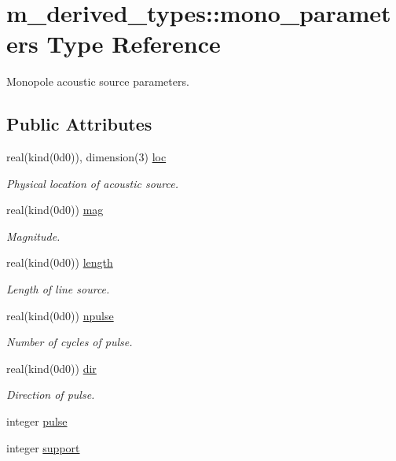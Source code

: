 \hypertarget{structm__derived__types_1_1mono__parameters}{}\section{m\+\_\+derived\+\_\+types\+:\+:mono\+\_\+parameters Type Reference}
\label{structm__derived__types_1_1mono__parameters}


Monopole acoustic source parameters.  


\subsection*{Public Attributes}
\begin{DoxyCompactItemize}
\item 
real(kind(0d0)), dimension(3) \hyperlink{structm__derived__types_1_1mono__parameters_a67f7e32fdd892aa007b28a1ea7ddd6dc}{loc}
\begin{DoxyCompactList}\small\item\em Physical location of acoustic source. \end{DoxyCompactList}\item 
real(kind(0d0)) \hyperlink{structm__derived__types_1_1mono__parameters_a62d3a0fb977b0ea3a1da97d6fbe5c99b}{mag}
\begin{DoxyCompactList}\small\item\em Magnitude. \end{DoxyCompactList}\item 
real(kind(0d0)) \hyperlink{structm__derived__types_1_1mono__parameters_a6fb20608c56428c842df5373ae35bb94}{length}
\begin{DoxyCompactList}\small\item\em Length of line source. \end{DoxyCompactList}\item 
real(kind(0d0)) \hyperlink{structm__derived__types_1_1mono__parameters_a3171e1895de6957a754d123f1d170833}{npulse}
\begin{DoxyCompactList}\small\item\em Number of cycles of pulse. \end{DoxyCompactList}\item 
real(kind(0d0)) \hyperlink{structm__derived__types_1_1mono__parameters_aca4c870db228262bb65d8ce47012e8ee}{dir}
\begin{DoxyCompactList}\small\item\em Direction of pulse. \end{DoxyCompactList}\item 
integer \hyperlink{structm__derived__types_1_1mono__parameters_a793ae086b0e3e92cbc558195186974fe}{pulse}
\item 
integer \hyperlink{structm__derived__types_1_1mono__parameters_af11bb5d1fd721a4e7255b0926d62b249}{support}
\end{DoxyCompactItemize}


